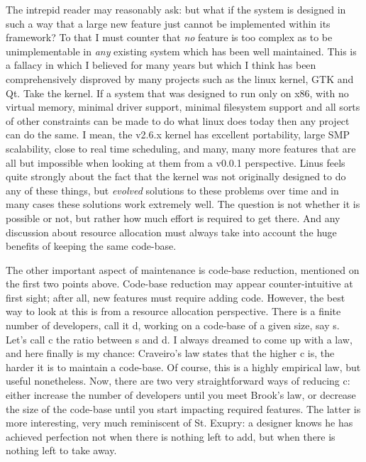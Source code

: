 \documentclass{memoir}
\begin{document}
The intrepid reader may reasonably ask: but what if the system is
designed in such a way that a large new feature just cannot be
implemented within its framework? To that I must counter that
\emph{no} feature is too complex as to be unimplementable in
\emph{any} existing system which has been well maintained. This is a
fallacy in which I believed for many years but which I think has been
comprehensively disproved by many projects such as the linux kernel,
GTK and Qt. Take the kernel. If a system that was designed to run only
on x86, with no virtual memory, minimal driver support, minimal
filesystem support and all sorts of other constraints can be made to
do what linux does today then any project can do the same. I mean, the
v2.6.x kernel has excellent portability, large SMP scalability, close
to real time scheduling, and many, many more features that are all but
impossible when looking at them from a v0.0.1 perspective. Linus feels
quite strongly about the fact that the kernel was not originally
designed to do any of these things, but \emph{evolved} solutions to
these problems over time and in many cases these solutions work
extremely well. The question is not whether it is possible or not, but
rather how much effort is required to get there. And any discussion
about resource allocation must always take into account the huge
benefits of keeping the same code-base.

The other important aspect of maintenance is code-base reduction,
mentioned on the first two points above. Code-base reduction may
appear counter-intuitive at first sight; after all, new features must
require adding code. However, the best way to look at this is from a
resource allocation perspective. There is a finite number of
developers, call it d, working on a code-base of a given size, say
s. Let's call c the ratio between s and d. I always dreamed to come up
with a law, and here finally is my chance: Craveiro's law states that
the higher c is, the harder it is to maintain a code-base. Of course,
this is a highly empirical law, but useful nonetheless. Now, there are
two very straightforward ways of reducing c: either increase the
number of developers until you meet Brook's law, or decrease the size
of the code-base until you start impacting required features. The
latter is more interesting, very much reminiscent of St. Exupry: a
designer knows he has achieved perfection not when there is nothing
left to add, but when there is nothing left to take away.
\end{document}
